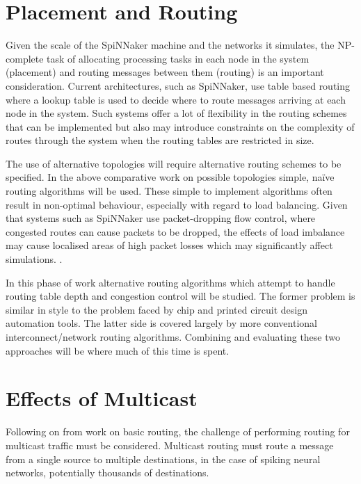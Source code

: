 	\section{Placement and Routing}
		
		Given the scale of the SpiNNaker machine and the networks it simulates, the
		NP-complete task of allocating processing tasks in each node in the system
		(placement) and routing messages between them (routing) is an important
		consideration. Current architectures, such as SpiNNaker, use table based
		routing where a lookup table is used to decide where to route messages
		arriving at each node in the system. Such systems offer a lot of flexibility
		in the routing schemes that can be implemented but also may introduce
		constraints on the complexity of routes through the system when the routing
		tables are restricted in size.
		
		The use of alternative topologies will require alternative routing schemes
		to be specified. In the above comparative work on possible topologies
		simple, na\"ive routing algorithms will be used. These simple to implement
		algorithms often result in non-optimal behaviour, especially with regard to
		load balancing\cite{dally04}. Given that systems such as SpiNNaker use
		packet-dropping flow control, where congested routes can cause packets to be
		dropped, the effects of load imbalance may cause localised areas of high
		packet losses which may significantly affect simulations.
		\cite{greenfield10}.
		
		In this phase of work alternative routing algorithms which attempt to handle
		routing table depth and congestion control will be studied. The former
		problem is similar in style to the problem faced by chip and printed circuit
		design automation tools. The latter side is covered largely by more
		conventional interconnect/network routing algorithms. Combining and
		evaluating these two approaches will be where much of this time is spent.
	
	\section{Effects of Multicast}
		
		Following on from work on basic routing, the challenge of performing routing
		for multicast traffic must be considered. Multicast routing must route a
		message from a single source to multiple destinations, in the case of
		spiking neural networks, potentially thousands of destinations.
		
